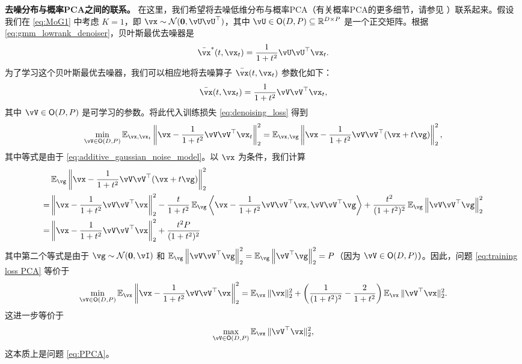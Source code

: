 \documentclass[../../book-main_zh.tex]{subfiles}
\begin{document}
\begin{remark}
{\bf 去噪分布与概率PCA之间的联系。} 在这里，我们希望将去噪低维分布与概率PCA（有关概率PCA的更多细节，请参见 ）联系起来。假设我们在 \eqref{eq:MoG1} 中考虑 $K=1$，即 $\vx \sim \dNorm(\vzero, \vU\vU^{\top})$，其中 \(\vU \in \O(D, P) \subseteq \R^{D \times P}\) 是一个正交矩阵。根据 \eqref{eq:gmm_lowrank_denoiser}，贝叶斯最优去噪器是
\begin{align}
    \bar{\vx}^{\ast}(t, \vx_{t}) = \frac{1}{1 + t^{2}} \vU\vU^\top\vx_t. 
\end{align}
为了学习这个贝叶斯最优去噪器，我们可以相应地将去噪算子 $\bar{\vx}(t,\vx_t)$ 参数化如下：
\begin{align}
    \bar{\vx}(t,\vx_t) = \frac{1}{1 + t^{2}} \vV\vV^\top\vx_t,
\end{align}
其中 $\vV \in \O(D, P)$ 是可学习的参数。将此代入训练损失 \eqref{eq:denoising_loss} 得到
\begin{equation}\label{eq:training loss PCA}
	  \min_{\vV \in \O(D, P)}\Ex_{\vx, \vx_{t}}\left\|\vx - \frac{1}{1 + t^{2}} \vV\vV^\top\vx_t\right\|_{2}^{2} = \Ex_{\vx, \vg}\left\|\vx - \frac{1}{1 + t^{2}} \vV\vV^\top(\vx + t\vg)\right\|_{2}^{2},
\end{equation}
其中等式是由于 \eqref{eq:additive_gaussian_noise_model}。以 $\vx$ 为条件，我们计算
\begin{align}
    & \Ex_{\vg}\left\|\vx - \frac{1}{1 + t^{2}} \vV\vV^\top(\vx + t\vg)\right\|_{2}^{2} \\
    = & \left\|\vx - \frac{1}{1 + t^{2}} \vV\vV^\top \vx\right\|_{2}^{2} - \frac{t}{1+t^2}\Ex_{\vg} \left\langle \vx - \frac{1}{1 + t^{2}} \vV\vV^\top \vx,  \vV\vV^\top\vg \right\rangle + \frac{t^2}{(1+t^2)^2} \Ex_{\vg}\left\| \vV\vV^\top \vg \right\|_2^2 \\
    = & \left\|\vx - \frac{1}{1 + t^{2}} \vV\vV^\top \vx\right\|_{2}^{2} + \frac{t^2P}{(1+t^2)^2} 
\end{align}
其中第二个等式是由于 \(\vg \sim \dNorm(\vzero, \vI)\) 和 $ \Ex_{\vg}\left\| \vV\vV^\top \vg \right\|_2^2 = \Ex_{\vg}\left\|\vV^\top \vg \right\|_2^2 = P$（因为 $\vV \in \O(D, P)$）。因此，问题 \eqref{eq:training loss PCA} 等价于
\begin{align}
    \min_{\vV \in \O(D, P)}\Ex_{\vx} \left\|\vx - \frac{1}{1 + t^{2}} \vV\vV^\top \vx\right\|_{2}^{2} = \Ex_{\vx} \|\vx\|_2^2 + \left( \frac{1}{(1+t^2)^2} - \frac{2}{1+t^2} \right) \Ex_{\vx}\|\vV^\top \vx\|_2^2.
\end{align}
这进一步等价于
\begin{align}
    \max_{\vV \in \O(D, P)} \Ex_{\vx}\|\vV^\top \vx\|_2^2,
\end{align}
这本质上是问题 \eqref{eq:PPCA}。
\end{remark}
\end{document}
